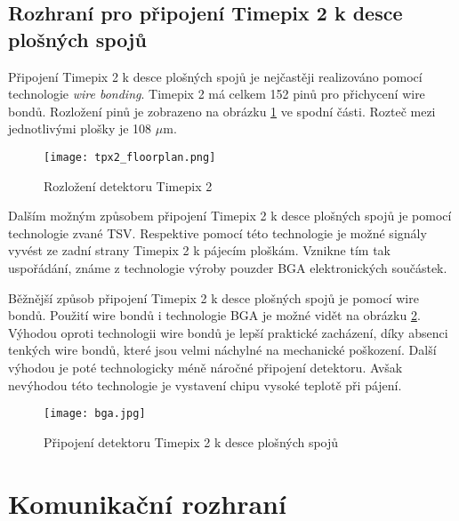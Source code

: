 \subsection{Rozhraní pro připojení Timepix 2 k desce plošných spojů}	%
Připojení Timepix 2 k desce plošných spojů je nejčastěji realizováno pomocí technologie \textit{wire bonding}. Timepix 2 má celkem 152 pinů pro přichycení wire bondů. Rozložení pinů je zobrazeno na obrázku \ref{fig:tpx2_floorplan} ve spodní části. Rozteč mezi jednotlivými plošky je 108 $\mu$m.
\begin{figure}[h!]
	\centering
	\captionsetup{justification=centering}
	\texttt{[image: tpx2\_floorplan.png]}
	\caption{Rozložení detektoru Timepix 2 \cite{tpx2_manual}} 
	\label{fig:tpx2_floorplan}
\end{figure}	
Dalším možným způsobem připojení Timepix 2 k desce plošných spojů je pomocí technologie zvané TSV. Respektive pomocí této technologie je možné signály vyvést ze zadní strany Timepix 2 k pájecím ploškám. Vznikne tím tak uspořádání, známe z technologie výroby pouzder BGA elektronických součástek. 
\par Běžnější způsob připojení Timepix 2 k desce plošných spojů je pomocí wire bondů. Použití wire bondů i technologie BGA je možné vidět na obrázku \ref{fig:bga}. Výhodou oproti technologii wire bondů je lepší praktické zacházení, díky absenci tenkých wire bondů, které jsou velmi náchylné na mechanické poškození. Další výhodou je poté technologicky méně náročné připojení detektoru. Avšak nevýhodou této technologie je vystavení chipu vysoké teplotě při pájení.
\begin{figure}[h!]
	\centering
	\captionsetup{justification=centering}
	\texttt{[image: bga.jpg]}
	\caption{Připojení detektoru Timepix 2 k desce plošných spojů \cite{TSV}} 
	\label{fig:bga}
\end{figure}	

\section{Komunikační rozhraní}
